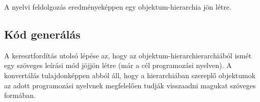 A nyelvi feldolgozás eredményeképpen egy objektum-hierarchia jön létre.

\subsection{Kód generálás}

A keresztfordítás utolsó lépése az, hogy az objektum-hierarchierarchiából ismét egy szöveges leírási mód jöjjön létre (már a cél programozási nyelven). A konvertálás tulajdonképpen abból áll, hogy a hierarchiában szereplő objektumok az adott programozási nyelvnek megfelelően tudják visszaadni magukat szöveges formában.
